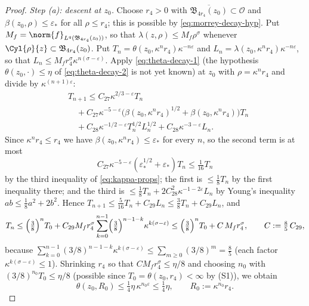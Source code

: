 \documentclass[11pt,reqno]{amsart}
\begin{document}
\begin{proof}
\emph{Step (a): descent at $z_{0}$.} Choose $r_{4}>0$ with
$\overline{\mathfrak{B}_{4r_{4}}(z_{0})}\subset\mathcal{O}$ and
$\beta(z_{0},\rho)\le\varepsilon_{*}$ for all $\rho\le r_{4}$; this is possible
by \eqref{eq:morrey-decay-hyp}. Put $M_{f}=\norm{f}_{L^{q}(\mathfrak{B}_{4r_{4}}(z_{0}))}$,
so that $\lambda(z,\rho)\le M_{f}\rho^{\sigma}$ whenever
$\Cyl{\rho}{z}\subset\mathfrak{B}_{4r_{4}}(z_{0})$. Put $T_{n}=\theta(z_{0},\kappa^{n}r_{4})\kappa^{-n\varepsilon}$ and
$L_{n}=\lambda(z_{0},\kappa^{n}r_{4})\kappa^{-n\varepsilon}$, so that
$L_{n}\le M_{f}r_{4}^{\sigma}\kappa^{n(\sigma-\varepsilon)}$. Apply
\eqref{eq:theta-decay-1} (the hypothesis
$\theta(z_{0},\cdot)\le\eta$ of \eqref{eq:theta-decay-2} is not yet known) at $z_{0}$ with
$\rho=\kappa^{n}r_{4}$ and divide by $\kappa^{(n+1)\varepsilon}$:
\[\begin{aligned}
  &T_{n+1}\le C_{27}\kappa^{2/3-\varepsilon}T_{n}
   \\ &\quad+C_{27}\kappa^{-5-\varepsilon}
     \bigl(\beta(z_{0},\kappa^{n}r_{4})^{1/2}+\beta(z_{0},\kappa^{n}r_{4})\bigr)T_{n}
   \\ &\quad+C_{28}\kappa^{-1/2-\varepsilon}T_{n}^{1/2}L_{n}^{1/2}
   +C_{28}\kappa^{-3-\varepsilon}L_{n}.
\end{aligned}\]
Since $\kappa^{n}r_{4}\le r_{4}$ we have $\beta(z_{0},\kappa^{n}r_{4})\le\varepsilon_{*}$
for every $n$, so the second term is at most
\[
C_{27}\kappa^{-5-\varepsilon}(\varepsilon_{*}^{1/2}+\varepsilon_{*})T_{n}
 \le\tfrac1{16}T_{n}
\]
 by the third inequality of \eqref{eq:kappa-props}; the
first is $\le\tfrac18T_{n}$ by the first inequality there; and the third is
$\le\tfrac18T_{n}+2C_{28}^{2}\kappa^{-1-2\varepsilon}L_{n}$ by Young's
inequality $ab\le\tfrac18a^{2}+2b^{2}$. Hence
$T_{n+1}\le\tfrac5{16}T_{n}+C_{29}L_{n}\le\tfrac38T_{n}+C_{29}L_{n}$, and
\[
  T_{n}\le\Bigl(\tfrac38\Bigr)^{n}T_{0}
   +C_{29}M_{f}r_{4}^{\sigma}\sum_{k=0}^{n-1}\Bigl(\tfrac38\Bigr)^{n-1-k}
     \kappa^{k(\sigma-\varepsilon)}
  \le\Bigl(\tfrac38\Bigr)^{n}T_{0}+C\,M_{f}r_{4}^{\sigma},
  \qquad C:=\tfrac85\,C_{29},
\]
because $\sum_{k=0}^{n-1}(3/8)^{n-1-k}\kappa^{k(\sigma-\varepsilon)}
 \le\sum_{m\ge0}(3/8)^{m}=\tfrac85$ (each factor $\kappa^{k(\sigma-\varepsilon)}\le1$). Shrinking
$r_{4}$ so that $C M_{f}r_{4}^{\sigma}\le\eta/8$ and choosing $n_{0}$ with
$(3/8)^{n_{0}}T_{0}\le\eta/8$ (possible since $T_{0}=\theta(z_{0},r_{4})<\infty$
by (S1)), we obtain
\begin{equation}\label{eq:descent}
  \theta(z_{0},R_{0})\le\tfrac14\eta\,\kappa^{n_{0}\varepsilon}\le\tfrac14\eta,
  \qquad R_{0}:=\kappa^{n_{0}}r_{4}.
\end{equation}


\end{proof}
\end{document}

